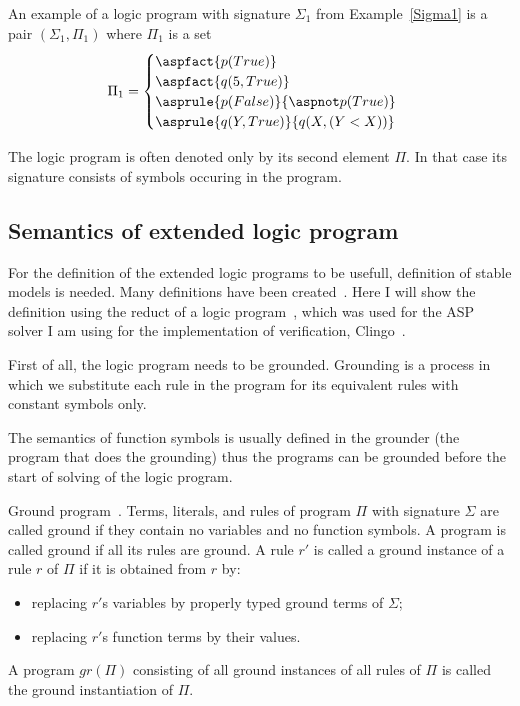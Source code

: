\begin{example}\label{exp:logic_program1}
    An example of a logic program with signature $\Sigma_1$ from Example~\ref{Sigma1}
    is a pair $(\Sigma_1, \Pi_1)$ where $\Pi_1$ is a set
    \begin{equation*}
        \Pi_1 =
            \begin{cases}
                \aspfact{p(True)}\\
                \aspfact{q(5, True)}\\
                \asprule{p(False)}{\aspnot p(True)}\\
                \asprule{q(Y, True)}{q(X, (Y < X))}
            \end{cases}
    \end{equation*}
\end{example}

The logic program is often denoted only by its second element $\Pi$.
In that case its signature consists of symbols occuring in the program.


\subsection{Semantics of extended logic program}

For the definition of the extended logic programs to be usefull,
definition of stable models is needed.
Many definitions have been created~\cite{12definitions}.
Here I will show the definition using the reduct
of a logic program~\cite{KRHandbook},
which was used for the ASP solver I am using for the implementation
of verification, Clingo~\cite{GebserKKS17}.

First of all, the logic program needs to be grounded.
Grounding is a process in which we substitute each rule
in the program for its equivalent rules with constant symbols only.

The semantics of function symbols is usually defined in the groun\-d\-er
(the program that does the grounding)
thus the programs can be grounded before the start of solving
of the logic program.

\begin{definition}{Ground program~\cite{KRHandbook}.}
    Terms, literals, and rules of program $\Pi$ with signature $\Sigma$ are called ground if they
    contain no variables and no function symbols. A program is called
    ground if all its rules are ground. A rule $r'$ is called a ground instance of a rule $r$ of $\Pi$
    if it is obtained from $r$ by:
    \begin{itemize}
        \item replacing $r'$s variables by properly typed ground terms of $\Sigma$;
        \item replacing $r'$s function terms by their values.
    \end{itemize}
    A program $gr(\Pi)$ consisting of all ground instances of all rules of $\Pi$
    is called the ground instantiation of $\Pi$.
\end{definition}

